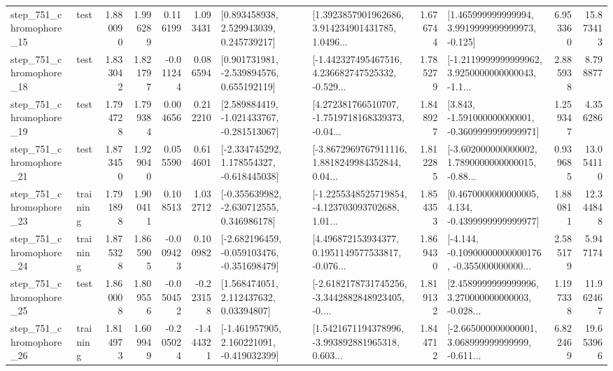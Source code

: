 \begin{tabular}{llrrrrllrlrr}
  step\_751\_chromophore\_15 &      test &      1.880090 &    1.996289 &      0.116199 &  1.093431 &     [0.893458938, 2.529943039, 0.245739217] &  [1.3923857901962686, 3.914234901431785, 1.0496... &       1.676744 &    [1.465999999999994, 3.9919999999999973, -0.125] &            6.953360 &         15.873413 \\
  step\_751\_chromophore\_18 &      test &      1.833042 &    1.821797 &     -0.011244 &  0.086594 &    [0.901731981, -2.539894576, 0.655192119] &  [-1.442327495467516, 4.236682747525332, -0.529... &       1.785279 &  [-1.2119999999999962, 3.9250000000000043, -1.1... &            2.885938 &          8.798877 \\
  step\_751\_chromophore\_19 &      test &      1.794728 &    1.799384 &      0.004656 &  0.212210 &   [2.589884419, -1.021433767, -0.281513067] &  [4.272381766510707, -1.7519718168339373, -0.04... &       1.848927 &   [3.843, -1.591000000000001, -0.3609999999999971] &            1.259347 &          4.356286 \\
  step\_751\_chromophore\_21 &      test &      1.873450 &    1.929040 &      0.055590 &  0.614601 &   [-2.334745292, 1.178554327, -0.618445038] &  [-3.8672969767911116, 1.8818249984352844, 0.04... &       1.812285 &  [-3.602000000000002, 1.7890000000000015, -0.88... &            0.939685 &         13.054110 \\
  step\_751\_chromophore\_23 &  training &      1.791898 &    1.900411 &      0.108513 &  1.032712 &   [-0.355639982, -2.630712555, 0.346986178] &  [-1.2255348525719854, -4.123703093702688, 1.01... &       1.854353 &   [0.4670000000000005, 4.134, -0.4399999999999977] &            1.880811 &         12.344848 \\
  step\_751\_chromophore\_24 &  training &      1.875328 &    1.865905 &     -0.009423 &  0.100982 &  [-2.682196459, -0.059103476, -0.351698479] &  [4.496872153934377, 0.1951149577533817, -0.076... &       1.869430 &  [-4.144, -0.10900000000000176, -0.355000000000... &            2.585179 &          5.947174 \\
  step\_751\_chromophore\_25 &      test &      1.860008 &    1.809556 &     -0.050452 & -0.223158 &      [1.568474051, 2.112437632, 0.03394807] &  [-2.6182178731745256, -3.3442882848923405, -0.... &       1.819132 &  [2.4589999999999996, 3.270000000000003, -0.028... &            1.197338 &         11.962467 \\
  step\_751\_chromophore\_26 &  training &      1.814973 &    1.609949 &     -0.205024 & -1.444321 &   [-1.461957905, 2.160221091, -0.419032399] &  [1.5421671194378996, -3.993892881965318, 0.603... &       1.844712 &  [-2.665000000000001, 3.068999999999999, -0.611... &            6.822469 &         19.653966 \\

\end{tabular}
